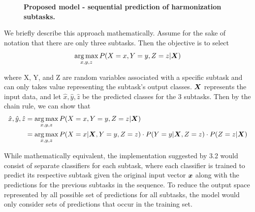 \documentclass[11pt]{book}
\begin{document}
\begin{figure}[h]
\begin{center}
\caption{\textbf{Proposed model - sequential prediction of harmonization subtasks.}}
\end{center}
\end{figure}

We briefly describe this approach mathematically. Assume for the sake of notation that there are only three subtasks. Then the objective is to select
$$\argmax_{x, y, z} P(X=x, Y=y, Z=z | \boldX)$$ 

where X, Y, and Z are random variables associated with a specific subtask and can only takes value representing the subtask's output classes. $\boldsymbol{X}$ represents the input data, and let $\hat{x}, \hat{y}, \hat{z}$ be the predicted classes for the 3 subtasks. Then by the chain rule, we can show that
\begin{align}
\hat{x}, \hat{y}, \hat{z} &= \argmax_{x, y, z} P(X=x, Y=y, Z=z | \boldX) \\
				  &= \argmax_{x,y,z} P(X=x | \boldX, Y=y, Z=z) \cdot P(Y=y | \boldX, Z=z) \cdot P(Z=z | \boldX)
\end{align}

While mathematically equivalent, the implementation suggested by 3.2 would consist of separate classifiers for each subtask, where each classifier is trained to predict its respective subtask given the original input vector $\boldsymbol{x}$ along with the predictions for the previous subtasks in the sequence. To reduce the output space represented by all possible set of predictions for all subtasks, the model would only consider sets of predictions that occur in the training set.
\end{document}
